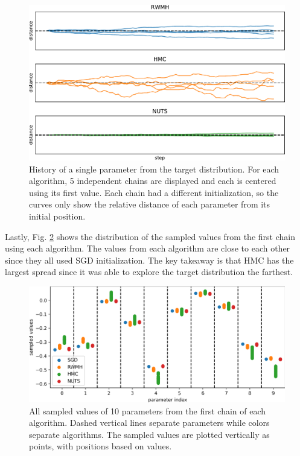 \documentclass[12pt]{article}
\begin{document}
{\begin{figure}[H]
\centering
\includegraphics[width=16cm]{plots/uci_param_history.pdf}
\caption{History of a single parameter from the target distribution. For each algorithm, 5 independent chains are displayed and each is centered using its first value. Each chain had a different initialization, so the curves only show the relative distance of each parameter from its initial position.}
\label{fig_uci_param_history}
\end{figure}

Lastly, Fig. \ref{fig_uci_param_distribution} shows the distribution of the sampled values from the first chain using each algorithm. The values from each algorithm are close to each other since they all used SGD initialization. The key takeaway is that HMC has the largest spread since it was able to explore the target distribution the farthest.

\begin{figure}[H]
\centering
\includegraphics[width=15cm]{plots/uci_param_distribution.png}
\caption{All sampled values of 10 parameters from the first chain of each algorithm. Dashed vertical lines separate parameters while colors separate algorithms. The sampled values are plotted vertically as points, with positions based on values.}
\label{fig_uci_param_distribution}
\end{figure}

}
\end{document}
